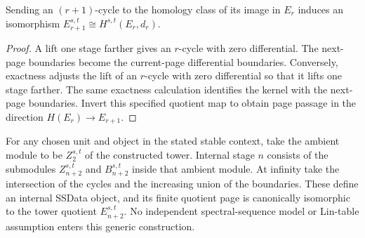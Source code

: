 \begin{proposition}
  \label{prop:h6-tower-page-passage}
  \leanok
  Sending an $(r+1)$-cycle to the homology class of its image in $E_r$
  induces an isomorphism $E_{r+1}^{s,t}\cong H^{s,t}(E_r,d_r)$.
\end{proposition}
\begin{proof}
  A lift one stage farther gives an $r$-cycle with zero differential.
  The next-page boundaries become the current-page differential boundaries.
  Conversely, exactness adjusts the lift of an $r$-cycle with zero
  differential so that it lifts one stage farther.  The same exactness
  calculation identifies the kernel with the next-page boundaries.
  Invert this specified quotient map to obtain page passage in the
  direction $H(E_r)\to E_{r+1}$.
  \leanok
\end{proof}

\begin{definition}
  \label{def:h6-tower-internal-data}
  \leanok
  For any chosen unit and object in the stated stable context, take the
  ambient module to be $Z_2^{s,t}$ of the constructed tower. Internal stage
  $n$ consists of the submodules $Z_{n+2}^{s,t}$ and $B_{n+2}^{s,t}$ inside
  that ambient module. At infinity take the intersection of the cycles
  and the increasing union of the boundaries. These define an internal
  SSData object, and its finite quotient page is canonically isomorphic
  to the tower quotient $E_{n+2}^{s,t}$. No independent spectral-sequence
  model or Lin-table assumption enters this generic construction.
\end{definition}

